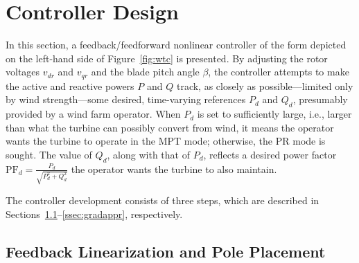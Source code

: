 \documentclass[journal]{IEEEtran}
\begin{document}
\section{Controller Design}\label{sec:contdes}

In this section, a feedback/feedforward nonlinear controller of the form depicted on the left-hand side of Figure~\ref{fig:wtc} is presented. By adjusting the rotor voltages $v_{dr}$ and $v_{qr}$ and the blade pitch angle $\beta$, the controller attempts to make the active and reactive powers $P$ and $Q$ track, as closely as possible---limited only by wind strength---some desired, time-varying references $P_d$ and $Q_d$, presumably provided by a wind farm operator. When $P_d$ is set to sufficiently large, i.e., larger than what the turbine can possibly convert from wind, it means the operator wants the turbine to operate in the MPT mode; otherwise, the PR mode is sought. The value of $Q_d$, along with that of $P_d$, reflects a desired power factor $\text{PF}_d=\frac{P_d}{\sqrt{P_d^2+Q_d^2}}$ the operator wants the turbine to also maintain.

The controller development consists of three steps, which are described in Sections~\ref{ssec:feedlinepoleplace}--\ref{ssec:gradappr}, respectively.

\subsection{Feedback Linearization and Pole Placement}\label{ssec:feedlinepoleplace}
\end{document}
